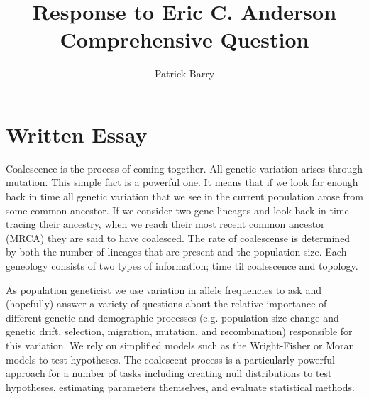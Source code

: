 \documentclass[11pt, oneside]{article}
\title{Response to Eric C. Anderson Comprehensive Question}
\author{Patrick Barry}
\begin{document}
\maketitle
\section{Written Essay}
	Coalescence is the process of coming together. All genetic variation arises through mutation. This
simple fact is a powerful one. It means that if we look far enough back in time all genetic variation that 
we see in the current population arose from some common ancestor. If we consider two gene lineages 
and look back in time tracing their ancestry, when we reach their most recent common ancestor (MRCA)
they are said to have coalesced. The rate of coalescense is determined by both the number of lineages that
are present and the population size. Each geneology consists of two types of information; time til 
coalescence and topology.

	As population geneticist we use variation in allele frequencies to ask and (hopefully)
answer a variety of questions about the relative importance of different genetic and demographic processes 
(e.g. population size change and genetic drift, selection, migration, mutation, and recombination)
responsible for this variation. We rely on simplified models such as the Wright-Fisher or Moran models to 
test hypotheses. The coalescent process is a particularly powerful approach for a number of tasks including
creating null distributions to test hypotheses, estimating parameters themselves, and evaluate statistical methods. 
\end{document}
